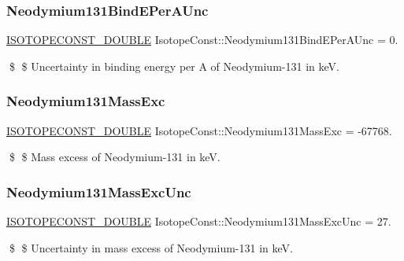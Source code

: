 \subsubsection{\texorpdfstring{Neodymium131\+Bind\+E\+Per\+A\+Unc}{Neodymium131BindEPerAUnc}}
{\footnotesize\ttfamily \mbox{\hyperlink{group___isotope_const-_macros_ga8f45a7272ce02c0b4c65c44636ed719a}{I\+S\+O\+T\+O\+P\+E\+C\+O\+N\+S\+T\+\_\+\+D\+O\+U\+B\+LE}} Isotope\+Const\+::\+Neodymium131\+Bind\+E\+Per\+A\+Unc = 0.}

\$ \$ Uncertainty in binding energy per A of Neodymium-\/131 in keV. \mbox{\label{group___isotope_const-_neodymium-_nd131_ga8f1b6b9ac8f3beae7e555125c6402ec9}} 
\subsubsection{\texorpdfstring{Neodymium131\+Mass\+Exc}{Neodymium131MassExc}}
{\footnotesize\ttfamily \mbox{\hyperlink{group___isotope_const-_macros_ga8f45a7272ce02c0b4c65c44636ed719a}{I\+S\+O\+T\+O\+P\+E\+C\+O\+N\+S\+T\+\_\+\+D\+O\+U\+B\+LE}} Isotope\+Const\+::\+Neodymium131\+Mass\+Exc = -\/67768.}

\$ \$ Mass excess of Neodymium-\/131 in keV. \mbox{\label{group___isotope_const-_neodymium-_nd131_ga87e343ea5b313340055fa4d89503af5f}} 
\subsubsection{\texorpdfstring{Neodymium131\+Mass\+Exc\+Unc}{Neodymium131MassExcUnc}}
{\footnotesize\ttfamily \mbox{\hyperlink{group___isotope_const-_macros_ga8f45a7272ce02c0b4c65c44636ed719a}{I\+S\+O\+T\+O\+P\+E\+C\+O\+N\+S\+T\+\_\+\+D\+O\+U\+B\+LE}} Isotope\+Const\+::\+Neodymium131\+Mass\+Exc\+Unc = 27.}

\$ \$ Uncertainty in mass excess of Neodymium-\/131 in keV. \mbox{\label{group___isotope_const-_neodymium-_nd131_ga7b2fcf7b9120a60a3ad6dd3814edc49d}} 
